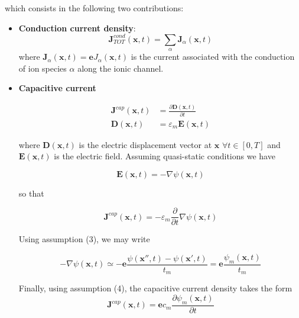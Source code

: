 \documentclass[a4paper]{article}
\begin{document}
which consists in the following two contributions:

\begin{itemize}
	
	\item \textbf{Conduction current density}: 
	\begin{equation}
		\textbf{J}^{cond}_{TOT}(\textbf{x},t) = \sum_{\alpha} \textbf{J}_{\alpha}(\textbf{x},t)
	\end{equation}
	where $\textbf{J}_{\alpha}(\textbf{x},t) = \textbf{e} J_{\alpha}(\textbf{x},t)$ is the current associated with the conduction of ion species $\alpha$ along the ionic channel.
	
	\item \textbf{Capacitive current} 
	
	\begin{align}
	\textbf{J}^{cap}(\textbf{x},t) &= \frac{\partial \textbf{D}(\textbf{x},t)}{\partial t}\\	
	\textbf{D}(\textbf{x},t) &= \varepsilon_m \textbf{E}(\textbf{x},t)
	\end{align}
	
	
	
	
	where $\textbf{D}(\textbf{x},t)$ is the electric displacement vector at $\textbf{x}$ $\forall t \in [0,T]$ and $\textbf{E}(\textbf{x},t)$ is the electric field. Assuming quasi-static conditions we have
	
	\begin{equation}
	\textbf{E}(\textbf{x},t) = - \nabla \psi(\textbf{x},t)
	\end{equation}
	
	so that
	
	\begin{equation}
	\textbf{J}^{cap}(\textbf{x},t) = -\varepsilon_m \frac{\partial}{\partial t}\nabla \psi(\textbf{x},t)
	\end{equation}


	
	Using assumption (3), we may write 
	
	$$ - \nabla \psi(\textbf{x},t) \simeq - \textbf{e} \frac{\psi(\textbf{x}'',t) - \psi(\textbf{x}',t)}{t_m} = \textbf{e} \frac{\psi_m(\textbf{x},t) }{t_m} $$
	
	Finally, using assumption (4), the capacitive current density takes the form
	\begin{equation}
		\textbf{J}^{cap}(\textbf{x},t) = \textbf{e} c_m \frac{\partial \psi_m (\textbf{x},t)}{\partial t}
	\end{equation}
\end{itemize}	
\end{document}
